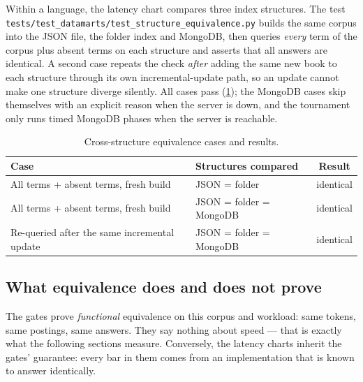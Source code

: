 Within a language, the latency chart compares three index structures. The
test \texttt{tests/\allowbreak test\_\allowbreak datamarts/\allowbreak test\_\allowbreak structure\_\allowbreak equivalence.py} builds
the same corpus into the JSON file, the folder index and MongoDB, then
queries \emph{every} term of the corpus plus absent terms on each structure
and asserts that all answers are identical. A second case repeats the check
\emph{after} adding the same new book to each structure through its own
incremental-update path, so an update cannot make one structure diverge
silently. All cases pass (\cref{tab:equivalence-tests}); the MongoDB cases
skip themselves with an explicit reason when the server is down, and the
tournament only runs timed MongoDB phases when the server is reachable.

\begin{table}[htbp]
    \centering
    \caption{Cross-structure equivalence cases and results.}
    \label{tab:equivalence-tests}
    \begin{tabular}{@{}llc@{}}
        \toprule
        Case & Structures compared & Result \\
        \midrule
        All terms + absent terms, fresh build & JSON = folder & identical \\
        All terms + absent terms, fresh build & JSON = folder = MongoDB & identical \\
        Re-queried after the same incremental update & JSON = folder = MongoDB & identical \\
        \bottomrule
    \end{tabular}
\end{table}

\subsection{What equivalence does and does not prove}
\label{sec:equivalence-scope}

The gates prove \emph{functional} equivalence on this corpus and workload:
same tokens, same postings, same answers. They say nothing about speed ---
that is exactly what the following sections measure. Conversely, the
latency charts inherit the gates' guarantee: every bar in them comes from an
implementation that is known to answer identically.
